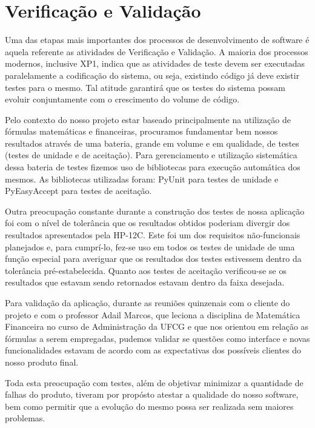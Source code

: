 \chapter{Verificação e Validação}
Uma das etapas mais importantes dos processos de desenvolvimento de software é aquela referente as atividades de Verificação e Validação. A maioria dos processos modernos, inclusive XP1, indica que as atividades de teste devem ser executadas paralelamente a codificação do sistema, ou seja, existindo código já deve existir testes para o mesmo. Tal atitude garantirá que os testes do sistema possam evoluir conjuntamente com o crescimento do volume de código.

Pelo contexto do nosso projeto estar baseado principalmente na utilização de fórmulas matemáticas e financeiras, procuramos fundamentar bem nossos resultados através de uma bateria, grande em volume e em qualidade, de testes (testes de unidade e de aceitação). Para gerenciamento e utilização sistemática dessa bateria de testes fizemos uso de bibliotecas para execução automática dos mesmos. As bibliotecas utilizadas foram: PyUnit para testes de unidade e PyEasyAccept para testes de aceitação.

Outra preocupação constante durante a construção dos testes de nossa aplicação foi com o nível de tolerância que os resultados obtidos poderiam divergir dos resultados apresentados pela HP-12C. Este foi um dos requisitos não-funcionais planejados e, para cumprí-lo, fez-se uso em todos os testes de unidade de uma função especial para averiguar que os resultados dos testes estivessem dentro da tolerância pré-estabelecida. Quanto aos testes de aceitação verificou-se se os resultados que estavam sendo retornados estavam dentro da faixa desejada.

Para validação da aplicação, durante as reuniões quinzenais com o cliente do projeto e com o professor Adail Marcos, que leciona a disciplina de Matemática Financeira no curso de Administração da UFCG e que nos orientou em relação as fórmulas a serem empregadas, pudemos validar se questões como interface e novas funcionalidades estavam de acordo com as expectativas dos possíveis clientes do nosso produto final.

Toda esta preocupação com testes, além de objetivar minimizar a quantidade de falhas do produto, tiveram por propósto atestar a qualidade do nosso software, bem como permitir que a evolução do mesmo possa ser realizada sem maiores problemas.

